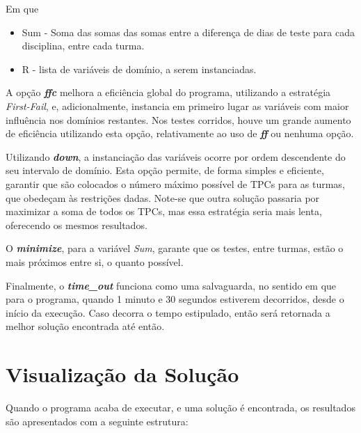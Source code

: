 \documentclass{llncs}
\begin{document}
Em que
\begin{itemize}
\item Sum - Soma das somas das somas entre a diferença de dias de teste para cada disciplina, entre cada turma.
\item R - lista de variáveis de domínio, a serem instanciadas.
\end{itemize}
 
A opção \textit{\textbf{ffc}} melhora a eficiência global do programa, utilizando a estratégia \textit{First-Fail}, e, adicionalmente, instancia em primeiro lugar as variáveis com maior influência nos domínios restantes. Nos testes corridos, houve um grande aumento de eficiência utilizando esta opção, relativamente ao uso de \textit{\textbf{ff}} ou nenhuma opção.\par
Utilizando \textit{\textbf{down}}, a instanciação das variáveis ocorre por ordem descendente do seu intervalo de domínio. Esta opção permite, de forma simples e eficiente, garantir que são colocados o número máximo possível de TPCs para as turmas, que obedeçam às restrições dadas. Note-se que outra solução passaria por maximizar a soma de todos os TPCs, mas essa estratégia seria mais lenta, oferecendo os mesmos resultados.\par
O \textit{\textbf{minimize}}, para a variável \textit{Sum}, garante que os testes, entre turmas, estão o mais próximos entre si, o quanto possível.\par
Finalmente, o \textit{\textbf{time\_out}} funciona como uma salvaguarda, no sentido em que para o programa, quando 1 minuto e 30 segundos estiverem decorridos, desde o início da execução. Caso decorra o tempo estipulado, então será retornada a melhor solução encontrada até então.



\section{Visualização da Solução}
Quando o programa acaba de executar, e uma solução é encontrada, os resultados são apresentados com a seguinte estrutura:\\
\end{document}
